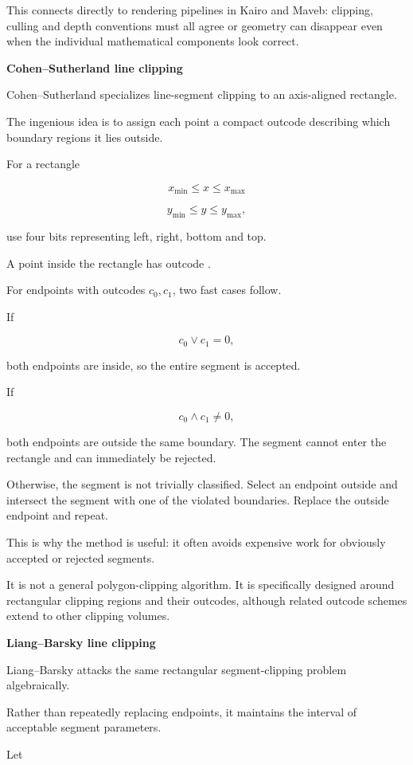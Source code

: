 This connects directly to rendering pipelines in Kairo and Maveb: clipping, culling and depth conventions must all agree or geometry can disappear even when the individual mathematical components look correct.

\textbf{Cohen--Sutherland line clipping}

Cohen--Sutherland specializes line-segment clipping to an axis-aligned rectangle.

The ingenious idea is to assign each point a compact outcode describing which boundary regions it lies outside.

For a rectangle

\[
x_{\min}\le x\le x_{\max}
\]

\[
y_{\min}\le y\le y_{\max},
\]

use four bits representing left, right, bottom and top.

A point inside the rectangle has outcode .

For endpoints with outcodes \(c_0,c_1\), two fast cases follow.

If

\[
c_0\lor c_1=0,
\]

both endpoints are inside, so the entire segment is accepted.

If

\[
c_0\land c_1\ne0,
\]

both endpoints are outside the same boundary. The segment cannot enter the rectangle and can immediately be rejected.

Otherwise, the segment is not trivially classified. Select an endpoint outside and intersect the segment with one of the violated boundaries. Replace the outside endpoint and repeat.

This is why the method is useful: it often avoids expensive work for obviously accepted or rejected segments.

It is not a general polygon-clipping algorithm. It is specifically designed around rectangular clipping regions and their outcodes, although related outcode schemes extend to other clipping volumes.

\textbf{Liang--Barsky line clipping}

Liang--Barsky attacks the same rectangular segment-clipping problem algebraically.

Rather than repeatedly replacing endpoints, it maintains the interval of acceptable segment parameters.

Let


